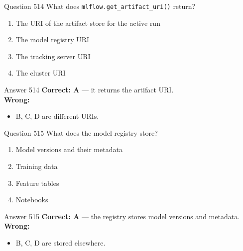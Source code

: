 \documentclass[aspectratio=169,11pt]{beamer}
\begin{document}
	\begin{frame}{Question 514}
		What does \texttt{mlflow.get\_artifact\_uri()} return?
		\begin{enumerate}[label=\Alph*.]
			\item The URI of the artifact store for the active run
			\item The model registry URI
			\item The tracking server URI
			\item The cluster URI
		\end{enumerate}
	\end{frame}
	\begin{frame}{Answer 514}
		\textbf{Correct: A} --- it returns the artifact URI.\\
		\vspace{0.5em}
		\textbf{Wrong:}
		\begin{itemize}
			\item B, C, D are different URIs.
		\end{itemize}
	\end{frame}
	
	\begin{frame}{Question 515}
		What does the model registry store?
		\begin{enumerate}[label=\Alph*.]
			\item Model versions and their metadata
			\item Training data
			\item Feature tables
			\item Notebooks
		\end{enumerate}
	\end{frame}
	\begin{frame}{Answer 515}
		\textbf{Correct: A} --- the registry stores model versions and metadata.\\
		\vspace{0.5em}
		\textbf{Wrong:}
		\begin{itemize}
			\item B, C, D are stored elsewhere.
		\end{itemize}
	\end{frame}
	
\end{document}
